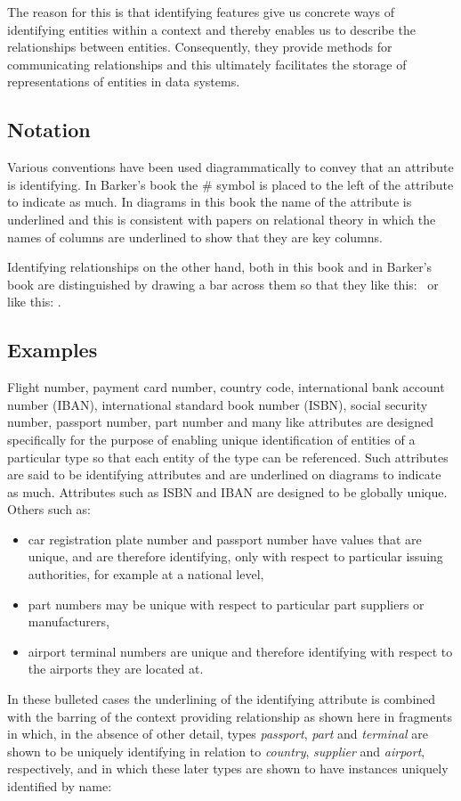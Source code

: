 \mynote
The reason for this is that identifying features give us concrete ways of identifying entities within a context and thereby enables us to describe the relationships between entities. Consequently, they provide methods for communicating  relationships and this ultimately facilitates the storage of representations of entities in data systems.

\subsection{Notation}
 \mynote
Various conventions have been used diagrammatically to convey that an attribute is identifying. In Barker's book the \# symbol is placed to the left of the attribute to indicate as much. In diagrams in this book the name of the attribute is underlined and this is consistent with papers on relational theory in which  the names of columns are underlined to show that they are key columns.

\mynote Identifying relationships on the other hand, both in this book and in Barker's book 
are distinguished by drawing a bar across them so that they like this: \barkerEllisJ\ or like this: \barkerEllisK.



 
\subsection{Examples}
\mynote
Flight number, payment card number, country code, international bank account number (IBAN), 
international standard book number (ISBN), social security number, passport number, part number and many like attributes are designed specifically for the purpose of enabling unique identification of entities of a particular type so that each entity of the type can be referenced. Such attributes are said to be identifying attributes and are underlined 
on diagrams to indicate as much. Attributes 
such as ISBN and IBAN are designed to be globally unique.  
Others such as:
\begin{itemize}
\item
car registration plate number and passport number have values that are unique, and are therefore identifying, only with respect to particular issuing authorities, for example at a national level,
\item part numbers may be unique with respect to particular part suppliers or manufacturers,
\item airport terminal numbers are unique and therefore identifying with respect to the airports they are located at.
\end{itemize}
In these bulleted cases the underlining of the identifying attribute is combined with the barring of the context providing relationship as shown here in fragments in which, in the absence of other detail, types \textit{passport}, \textit{part} and \textit{terminal} are shown to be uniquely identifying  in relation
to \textit{country}, \textit{supplier} and \textit{airport}, respectively, 
and in which these later types are shown to have instances uniquely identified by name:

